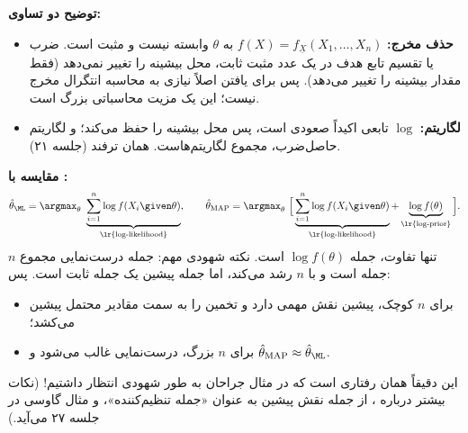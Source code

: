 \textbf{توضیح دو تساوی:}
\begin{itemize}
\item \textbf{حذف مخرج:} $f(X)=f_{\underline X}(X_1,\ldots,X_n)$ به $\theta$ وابسته نیست و مثبت است. ضرب یا تقسیم تابع هدف در یک عدد مثبت ثابت، محل بیشینه را تغییر نمی‌دهد (فقط مقدار بیشینه را تغییر می‌دهد). پس برای یافتن  اصلاً نیازی به محاسبه انتگرال مخرج نیست؛ این یک مزیت محاسباتی بزرگ است.
\item \textbf{لگاریتم:} $\log$ تابعی اکیداً صعودی است، پس محل بیشینه را حفظ می‌کند؛ و لگاریتم حاصل‌ضرب، مجموع لگاریتم‌هاست. همان ترفند  (جلسه ۲۱).
\end{itemize}

\textbf{مقایسه با :}
\[
\hat\theta_\ML=\argmax_\theta\ \underbrace{\sum_{i=1}^n\log f(X_i\given\theta)}_{\text{\lr{log-likelihood}}},
\qquad
\hat\theta_{\mathrm{MAP}}=\argmax_\theta\ \Big[\underbrace{\sum_{i=1}^n\log f(X_i\given\theta)}_{\text{\lr{log-likelihood}}}+\underbrace{\log f(\theta)}_{\text{\lr{log-prior}}}\Big].
\]
تنها تفاوت، جمله $\log f(\theta)$ است. نکته شهودی مهم: جمله درست‌نمایی مجموع $n$ جمله است و با $n$ رشد می‌کند، اما جمله پیشین یک جمله ثابت است. پس:
\begin{itemize}
\item برای $n$ کوچک، پیشین نقش مهمی دارد و تخمین را به سمت مقادیر محتمل پیشین می‌کشد؛
\item برای $n$ بزرگ، درست‌نمایی غالب می‌شود و $\hat\theta_{\mathrm{MAP}}\approx\hat\theta_\ML$.
\end{itemize}
این دقیقاً همان رفتاری است که در مثال جراحان به طور شهودی انتظار داشتیم! (نکات بیشتر درباره ، از جمله نقش پیشین به عنوان «جمله تنظیم‌کننده»، و مثال گاوسی در جلسه ۲۷ می‌آید.)

